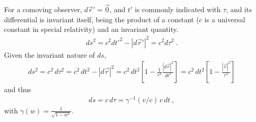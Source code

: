 \documentclass[letterpaper,10pt,english]{jupyterBook}
\begin{document}
\sphinxAtStartPar
For a co\sphinxhyphen{}moving observer, \(d \vec{r}' = \vec{0}\), and \(t'\) is commonly indicated with \(\tau\), and its differential is invariant itself, being the product of a constant (\(c\) is a universal constant in special relativity) and an invariant quantity.
\begin{equation*}
\begin{split}d s^2 = c^2 dt'^2 - |d \vec{r}'|^2 = c^2 d \tau^2 \ .\end{split}
\end{equation*}
\sphinxAtStartPar
Given the invariant nature of \(d s\),
\begin{equation*}
\begin{split}d s^2 = c^2 \, d \tau^2 = c^2 \, dt^2 - |d \vec{r}|^2 = c^2 \, dt^2 \left[ 1 - \frac{1}{c^2}\frac{|d\vec{r}|^2}{dt^2} \right] = c^2 \, dt^2 \left[ 1 - \frac{|\vec{v}|^2}{c^2} \right]\end{split}
\end{equation*}
\sphinxAtStartPar
and thus
\begin{equation*}
\begin{split}d s = c \, d \tau = \gamma^{-1}(v/c) \, c \, dt \ ,\end{split}
\end{equation*}
\sphinxAtStartPar
with \(\gamma(w) = \frac{1}{\sqrt{1 - w^2}}\).
\end{document}
